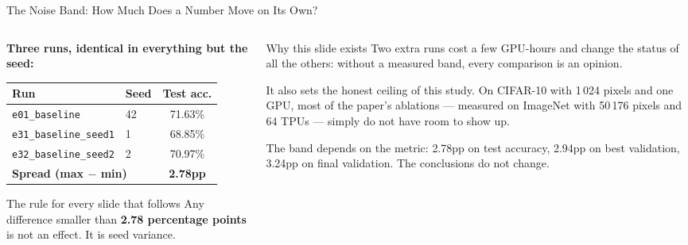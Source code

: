 \documentclass[aspectratio=169,11pt]{beamer}
\begin{document}
\begin{frame}[shrink=5]{The Noise Band: How Much Does a Number Move on Its Own?}
  \begin{columns}[T]
    \begin{column}{0.52\textwidth}
      \textbf{Three runs, identical in everything but the seed:}
      \begin{table}
        \centering\small
        \begin{tabular}{llc}
          \toprule
          \textbf{Run} & \textbf{Seed} & \textbf{Test acc.} \\
          \midrule
          \texttt{e01\_baseline} & 42 & 71.63\% \\
          \texttt{e31\_baseline\_seed1} & 1 & 68.85\% \\
          \texttt{e32\_baseline\_seed2} & 2 & 70.97\% \\
          \midrule
          \multicolumn{2}{l}{\textbf{Spread (max $-$ min)}} & \textbf{2.78pp} \\
          \bottomrule
        \end{tabular}
      \end{table}

      \vspace{0.3em}
      \begin{alertblock}{The rule for every slide that follows}
        \small
        Any difference smaller than \textbf{2.78 percentage points} is not an effect. It is seed variance.
      \end{alertblock}
    \end{column}
    \begin{column}{0.44\textwidth}
      \begin{block}{Why this slide exists}
        \small
        Two extra runs cost a few GPU-hours and change the status of all the others: without a measured band, every comparison is an opinion.

        \vspace{0.4em}
        It also sets the honest ceiling of this study. On CIFAR-10 with 1\,024 pixels and one GPU, most of the paper's ablations --- measured on ImageNet with 50\,176 pixels and 64 TPUs --- simply do not have room to show up.
      \end{block}

      \vspace{0.3em}
      \scriptsize The band depends on the metric: 2.78pp on test accuracy, 2.94pp on best validation, 3.24pp on final validation. The conclusions do not change.
    \end{column}
  \end{columns}
\end{frame}
\end{document}

